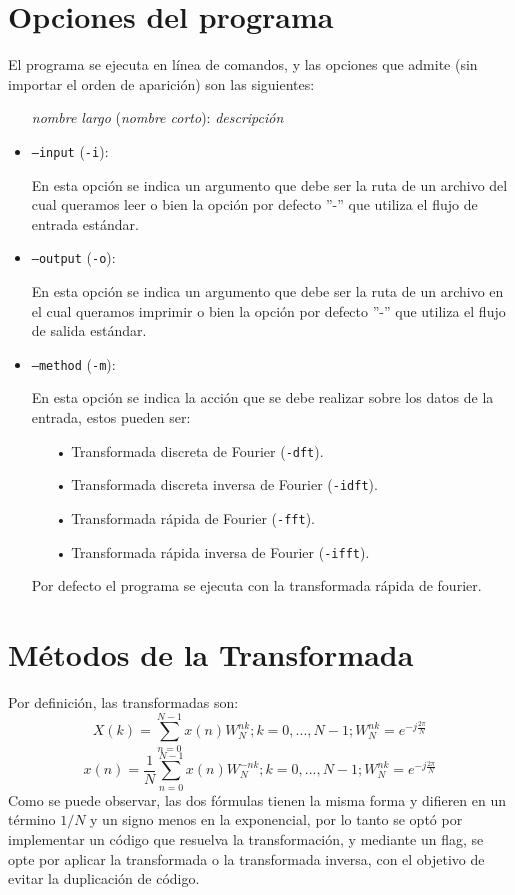 \documentclass{article}
\begin{document}
\section{Opciones del programa}
  El programa se ejecuta en línea de comandos, y las opciones que admite (sin importar el orden de aparición) son las siguientes:
  \begin{itemize}
    \item[] \textit{nombre largo} (\textit{nombre corto}): \textit{descripción}
    \item \texttt{--input} (\texttt{-i}): 
    
    En esta opción se indica un argumento que debe ser la ruta de un archivo del cual queramos leer o bien la opción por defecto ”-” que utiliza el flujo de entrada estándar.
    \item \texttt{--output} (\texttt{-o}): 
    
    En esta opción se indica un argumento que debe ser la ruta de un archivo en el cual queramos imprimir o bien la opción por defecto ”-” que utiliza el flujo de salida estándar.
    \item \texttt{--method} (\texttt{-m}): 
    
    En esta opción se indica la acción que se debe realizar sobre los datos de la entrada, estos pueden ser:
    \begin{itemize}
    \item[•]Transformada discreta de Fourier (\texttt{-dft}).
    \item[•]Transformada discreta inversa de Fourier (\texttt{-idft}).
    \item[•]Transformada rápida de Fourier (\texttt{-fft}).
    \item[•]Transformada rápida inversa de Fourier (\texttt{-ifft}).
    
    \end{itemize}
    Por defecto el programa se ejecuta con la transformada rápida de fourier.
  \end{itemize}

\section{Métodos de la Transformada}
Por definición, las transformadas son:\\
\begin{equation}
X(k)=\sum\limits_{n=0}^{N-1} x(n)W_N^{nk}; k=0,...,N-1; W_N^{nk} = e^{-j\frac{2\pi}{N}}
\end{equation}
\begin{equation}
x(n)=\frac{1}{N}\sum\limits_{n=0}^{N-1} x(n)W_N^{-nk}; k=0,...,N-1; W_N^{nk} = e^{-j\frac{2\pi}{N}}
\end{equation}
Como se puede observar, las dos fórmulas tienen la misma forma y difieren en un término $1/N$ y un signo menos en la exponencial, por lo tanto se optó por implementar un código que resuelva la transformación, y mediante un flag, se opte por aplicar la transformada o la transformada inversa, con el objetivo de evitar la duplicación de código.\\
\end{document}
